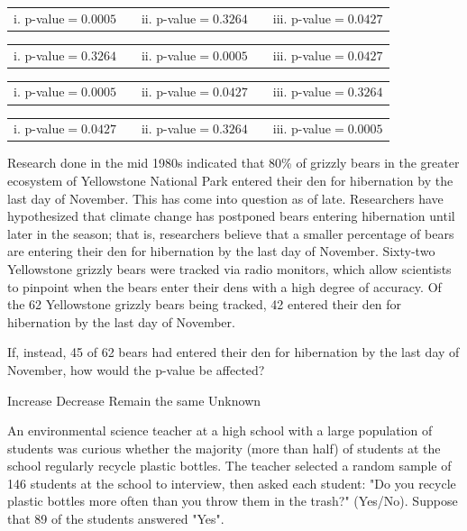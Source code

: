 \documentclass{article}
\begin{document}
\begin{mcquestions}
	\begin{mcanswerslist}
		\answer \begin{tabular}{lp{0.75in}cp{0.75in}r}
			i. p-value$=0.0005$ && ii. p-value$=0.3264$ && iii. p-value$=0.0427$
		\end{tabular}
		\answer[correct] \begin{tabular}{lp{0.75in}cp{0.75in}r}
			i. p-value$=0.3264$ && ii. p-value$=0.0005$ && iii. p-value$=0.0427$
		\end{tabular}
		\answer \begin{tabular}{lp{0.75in}cp{0.75in}r}
			i. p-value$=0.0005$ && ii. p-value$=0.0427$ && iii. p-value$=0.3264$
		\end{tabular}
		\answer \begin{tabular}{lp{0.75in}cp{0.75in}r}
			i. p-value$=0.0427$ && ii. p-value$=0.3264$ && iii. p-value$=0.0005$
		\end{tabular}
	\end{mcanswerslist}
	
	\question \question Research done in the mid 1980s indicated that 80\% of grizzly bears in the greater ecosystem of Yellowstone National Park entered their den for hibernation by the last day of November. This has come into question as of late. Researchers have hypothesized that climate change has postponed bears entering hibernation until later in the season; that is, researchers believe that a smaller percentage of bears are entering their den for hibernation by the last day of November. 
	Sixty-two Yellowstone grizzly bears were tracked via radio monitors, which allow scientists to pinpoint when the bears enter their dens with a high degree of accuracy. Of the 62 Yellowstone grizzly bears being tracked, 42 entered their den for hibernation by the last day of November.
	
	If, instead, 45 of 62 bears had entered their den for hibernation by the last day of November, how would the p-value be affected?
	
	\begin{mcanswerslist}
		\answer[correct] Increase
		\answer Decrease
		\answer Remain the same
		\answer Unknown
	\end{mcanswerslist}
	
	\begin{mcquestioninstruction}
		An environmental science teacher at a high school with a large population of students was curious whether the majority (more than half) of students at the school regularly recycle plastic bottles. The teacher selected a random sample of 146 students at the school to interview, then asked each student: "Do you recycle plastic bottles more often than you throw them in the trash?" (Yes/No). Suppose that 89 of the students answered "Yes".
		

\end{mcquestioninstruction}
\end{mcquestions}
\end{document}
